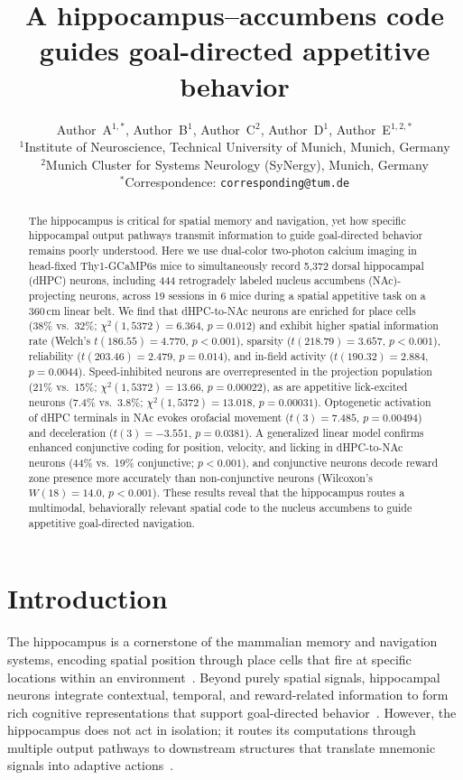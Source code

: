 \documentclass[11pt]{article}
\title{A hippocampus--accumbens code guides goal-directed appetitive behavior}
\author{%
  Author~A$^{1,\ast}$, Author~B$^{1}$, Author~C$^{2}$, Author~D$^{1}$, Author~E$^{1,2,\ast}$\\[6pt]
  \small $^{1}$Institute of Neuroscience, Technical University of Munich, Munich, Germany\\
  \small $^{2}$Munich Cluster for Systems Neurology (SyNergy), Munich, Germany\\
  \small $^{\ast}$Correspondence: \texttt{corresponding@tum.de}
}
\date{}
\begin{document}
\maketitle

\begin{abstract}
The hippocampus is critical for spatial memory and navigation, yet how specific hippocampal output pathways transmit information to guide goal-directed behavior remains poorly understood. Here we use dual-color two-photon calcium imaging in head-fixed Thy1-GCaMP6s mice to simultaneously record 5,372 dorsal hippocampal (dHPC) neurons, including 444 retrogradely labeled nucleus accumbens (NAc)-projecting neurons, across 19 sessions in 6 mice during a spatial appetitive task on a 360\,cm linear belt. We find that dHPC-to-NAc neurons are enriched for place cells (38\% vs.\ 32\%; $\chi^{2}(1, 5372)=6.364$, $p=0.012$) and exhibit higher spatial information rate (Welch's $t(186.55)=4.770$, $p<0.001$), sparsity ($t(218.79)=3.657$, $p<0.001$), reliability ($t(203.46)=2.479$, $p=0.014$), and in-field activity ($t(190.32)=2.884$, $p=0.0044$). Speed-inhibited neurons are overrepresented in the projection population (21\% vs.\ 15\%; $\chi^{2}(1, 5372)=13.66$, $p=0.00022$), as are appetitive lick-excited neurons (7.4\% vs.\ 3.8\%; $\chi^{2}(1, 5372)=13.018$, $p=0.00031$). Optogenetic activation of dHPC terminals in NAc evokes orofacial movement ($t(3)=7.485$, $p=0.00494$) and deceleration ($t(3)=-3.551$, $p=0.0381$). A generalized linear model confirms enhanced conjunctive coding for position, velocity, and licking in dHPC-to-NAc neurons (44\% vs.\ 19\% conjunctive; $p<0.001$), and conjunctive neurons decode reward zone presence more accurately than non-conjunctive neurons (Wilcoxon's $W(18)=14.0$, $p<0.001$). These results reveal that the hippocampus routes a multimodal, behaviorally relevant spatial code to the nucleus accumbens to guide appetitive goal-directed navigation.
\end{abstract}

\section{Introduction}

The hippocampus is a cornerstone of the mammalian memory and navigation systems, encoding spatial position through place cells that fire at specific locations within an environment~\citep{okeefe1971, moser2008}. Beyond purely spatial signals, hippocampal neurons integrate contextual, temporal, and reward-related information to form rich cognitive representations that support goal-directed behavior~\citep{eichenbaum2014, markus1995}. However, the hippocampus does not act in isolation; it routes its computations through multiple output pathways to downstream structures that translate mnemonic signals into adaptive actions~\citep{pennartz2011, wikenheiser2015}.
\end{document}
